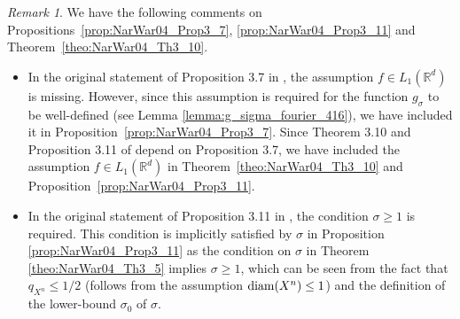 \documentclass[11pt]{article}
\theoremstyle{remark}
\newtheorem{remark}{Remark}
\theoremstyle{example}
\theoremstyle{remark}
\newcommand{\R}{\mathbb{R}}
\begin{document}
\begin{remark} \rm \label{rem:append-assumptions}
We have the following comments on Propositions~\ref{prop:NarWar04_Prop3_7}, \ref{prop:NarWar04_Prop3_11} and Theorem~\ref{theo:NarWar04_Th3_10}.\vspace{-3mm}
\begin{itemize}
\item 
In the original statement of Proposition 3.7 in \cite{NarWar04}, the assumption $f \in L_1(\R^d)$ is missing. 
However, since this assumption is required for the function $g_\sigma$ to be well-defined (see Lemma \ref{lemma:g_sigma_fourier_416}), we have included it in Proposition~\ref{prop:NarWar04_Prop3_7}. Since Theorem 3.10 and Proposition 3.11 of \cite{NarWar04} depend on Proposition 3.7, we have included the assumption $f \in L_1(\R^d)$ in Theorem~\ref{theo:NarWar04_Th3_10} and Proposition~\ref{prop:NarWar04_Prop3_11}.\vspace{-1mm}

\item In the original statement of Proposition 3.11 in \cite{NarWar04}, the condition $\sigma \geq 1$ is required. 
This condition is implicitly satisfied by $\sigma$ in Proposition \ref{prop:NarWar04_Prop3_11} as the condition on $\sigma$ in Theorem \ref{theo:NarWar04_Th3_5} implies $\sigma\ge 1$, which can be seen from the fact that
$q_{X^n} \leq 1/2$ (follows from the assumption ${\rm diam}(X^n) \leq 1$) and the definition of the lower-bound $\sigma_0$ of $\sigma$. 




\end{itemize}
\end{remark}
\end{document}
